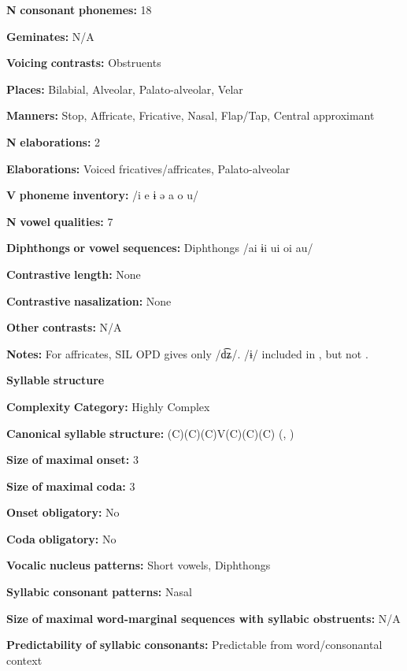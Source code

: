 \begin{styleBody}
\textbf{N} \textbf{consonant} \textbf{phonemes:} 18

\textbf{Geminates:} N/A

\textbf{Voicing} \textbf{contrasts:} Obstruents

\textbf{Places:} Bilabial, Alveolar, Palato-alveolar, Velar

\textbf{Manners:} Stop, Affricate, Fricative, Nasal, Flap/Tap, Central approximant

\textbf{N} \textbf{elaborations:} 2

\textbf{Elaborations:} Voiced fricatives/affricates, Palato-alveolar

\textbf{V} \textbf{phoneme} \textbf{inventory:} /i e ɨ ə a o u/

\textbf{N} \textbf{vowel} \textbf{qualities:} 7

\textbf{Diphthongs} \textbf{or} \textbf{vowel} \textbf{sequences:} Diphthongs /ai ɨi ui oi au/

\textbf{Contrastive} \textbf{length:} None

\textbf{Contrastive} \textbf{nasalization:} None

\textbf{Other} \textbf{contrasts:} N/A

\textbf{Notes:} For affricates, SIL OPD gives only /d͡ʑ/. /ɨ/ included in \citet{Bruce1984}, but not \citet{EdmistonEdmiston2003}.

\textbf{Syllable} \textbf{structure}

\textbf{Complexity} \textbf{Category:} Highly Complex

\textbf{Canonical} \textbf{syllable} \textbf{structure:} (C)(C)(C)V(C)(C)(C) (\citealt{Bruce1984}, \citealt{EdmistonEdmiston2003})

\textbf{Size} \textbf{of} \textbf{maximal} \textbf{onset:} 3

\textbf{Size} \textbf{of} \textbf{maximal} \textbf{coda:} 3

\textbf{Onset} \textbf{obligatory:} No

\textbf{Coda} \textbf{obligatory:} No

\textbf{Vocalic} \textbf{nucleus} \textbf{patterns:} Short vowels, Diphthongs

\textbf{Syllabic} \textbf{consonant} \textbf{patterns:} Nasal

\textbf{Size} \textbf{of} \textbf{maximal} \textbf{word{}-marginal sequences with syllabic obstruents:} N/A

\textbf{Predictability} \textbf{of} \textbf{syllabic} \textbf{consonants:} Predictable from word/consonantal context


\end{styleBody}
